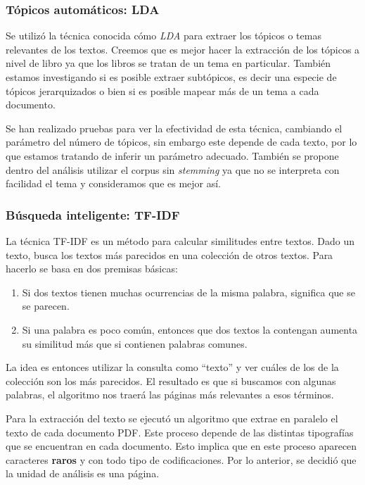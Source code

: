 \subsubsection{Tópicos automáticos: LDA} \label{topicos-automaticos-lda}

Se utilizó la técnica conocida cómo \emph{LDA} para
extraer los tópicos o temas relevantes de los textos. Creemos que es
mejor hacer la extracción de los tópicos a nivel de libro ya que los
libros se tratan de un tema en particular. También estamos investigando
si es posible extraer subtópicos, es decir una especie de tópicos
jerarquizados o bien si es posible mapear más de un tema a cada
documento.

Se han realizado pruebas para ver la efectividad de esta técnica,
cambiando el parámetro del número de tópicos, sin embargo este depende
de cada texto, por lo que estamos tratando de inferir un parámetro
adecuado. También se propone dentro del análisis utilizar el corpus sin
\emph{stemming} ya que no se interpreta con facilidad el tema y
consideramos que es mejor así.



\subsubsection{Búsqueda inteligente:
TF-IDF}\label{busqueda-inteligente-tf-idf}


La técnica TF-IDF es un
método para calcular similitudes entre textos. Dado un texto, busca los
textos más parecidos en una colección de otros textos. Para hacerlo se
basa en dos premisas básicas:

\begin{enumerate}
\def\labelenumi{\arabic{enumi})}
\itemsep1pt\parskip0pt
\item
  Si dos textos tienen muchas ocurrencias de la misma palabra, significa
  que se se parecen.
\item
  Si una palabra es poco común, entonces que dos textos la contengan
  aumenta su similitud más que si contienen palabras comunes.
\end{enumerate}

La idea es entonces utilizar la consulta como ``texto'' y ver cuáles de
los de la colección son los más parecidos. El resultado es que si
buscamos con algunas palabras, el algoritmo nos traerá las páginas más
relevantes a esos términos.


Para la extracción del texto se ejecutó un algoritmo que extrae en paralelo el texto de cada documento PDF. Este proceso depende de las distintas tipografías que se encuentran en cada documento. Esto implica que en este proceso aparecen caracteres \textbf{raros} y con todo tipo de codificaciones. Por lo anterior, se decidió que la unidad de análisis es una página. 


